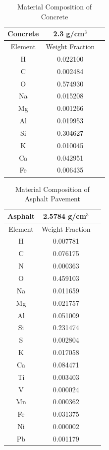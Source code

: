 \begin{table}[!htp]
 \caption{Material Composition of Concrete}
  \begin{center}
    \begin{tabulary}{\columnwidth}{ccc}
      \hline
      Concrete & 2.3 g/cm$^{3}$\\ \hline
      Element & Weight Fraction\\ \hline
      H & 0.022100  \\
      C & 0.002484 \\
      O & 0.574930 \\
      Na & 0.015208 \\
      Mg & 0.001266 \\
      Al & 0.019953 \\
      Si & 0.304627 \\
      K & 0.010045 \\
      Ca & 0.042951 \\
      Fe & 0.006435 \\ \hline
    \end{tabulary}
  \end{center}
  \label{table:concrete}
\end{table}

\begin{table}[!htp]
 \caption{Material Composition of Asphalt Pavement}
  \begin{center}
    \begin{tabulary}{\columnwidth}{ccc}
      \hline
      Asphalt & 2.5784 g/cm$^{3}$\\ \hline
      Element & Weight Fraction\\ \hline
      H & 0.007781\\
      C & 0.076175\\
      N & 0.000363\\
      O & 0.459103\\
      Na & 0.011659\\
      Mg & 0.021757\\
      Al & 0.051009\\
      Si & 0.231474\\
      S & 0.002804\\
      K & 0.017058\\
      Ca & 0.084471\\
      Ti & 0.003403\\
      V & 0.000024\\
      Mn & 0.000362\\
      Fe & 0.031375\\
      Ni & 0.000002\\
      Pb & 0.001179\\ \hline
    \end{tabulary}
  \end{center}
  \label{table:asphalt}
\end{table}

